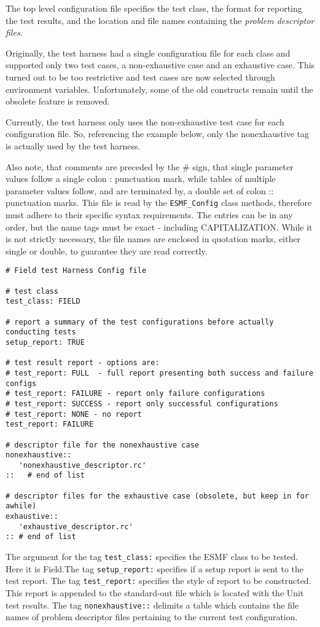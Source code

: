 The top level configuration file specifies the test class, the 
format for reporting the test results, and the location and file names containing 
the \textit{problem descriptor files}. 

Originally, the test harness had a single configuration file for each class and 
supported only two test cases, a non-exhaustive case and an exhaustive case.
This turned out to be too restrictive and test cases are now selected through environment variables.
Unfortunately, some of the old constructs remain until the obsolete feature is removed.

Currently, the test harness only uses the non-exhaustive test case for each configuration file.
So, referencing the example below, only the nonexhaustive tag is actually used by the test harness. 

Also note, that comments are preceded by the {\#} sign, that single parameter values follow 
a single colon {:} punctuation mark, while tables of multiple parameter values follow, 
and are terminated by, a double set of colon {::} punctuation marks.  
This file is read by the \texttt{ESMF\_Config} class methods, therefore must adhere 
to their specific syntax requirements. 
The entries can be in any order, but the name tags must be exact - including CAPITALIZATION. 
While it is not strictly necessary, the file names are enclosed in quotation marks, 
either single or double, to guarantee they are read correctly.
\begin{verbatim}
# Field test Harness Config file

# test class
test_class: FIELD 

# report a summary of the test configurations before actually conducting tests
setup_report: TRUE

# test result report - options are:
# test_report: FULL  - full report presenting both success and failure configs
# test_report: FAILURE - report only failure configurations
# test_report: SUCCESS - report only successful configurations
# test_report: NONE - no report
test_report: FAILURE

# descriptor file for the nonexhaustive case
nonexhaustive::
   'nonexhaustive_descriptor.rc'
::   # end of list

# descriptor files for the exhaustive case (obsolete, but keep in for awhile)
exhaustive::
   'exhaustive_descriptor.rc'
:: # end of list
\end{verbatim}

The argument for the tag \texttt{test\_class:} specifies the ESMF class to be tested. 
Here it is Field.The tag  \texttt{setup\_report:} specifies if a setup report is sent to the test report. 
The tag  \texttt{test\_report:} specifies the style of report to be constructed. 
This report is appended to the standard-out file which is located with the Unit test results. 
The tag \texttt{nonexhaustive::} delimits a table which contains the file names of 
problem descriptor files pertaining to the current test configuration. 

